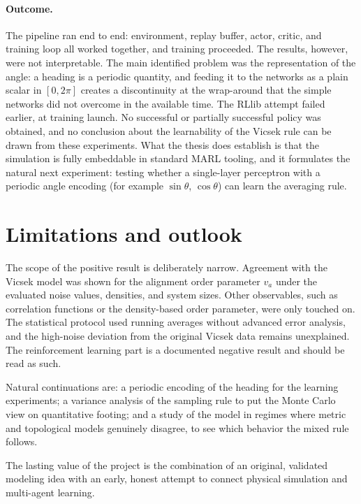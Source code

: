\documentclass[10pt,a4paper,twocolumn]{article}
\begin{document}
\paragraph{Outcome.}
The pipeline ran end to end: environment, replay buffer, actor,
critic, and training loop all worked together, and training
proceeded. The results, however, were not interpretable. The main
identified problem was the representation of the angle: a heading is
a periodic quantity, and feeding it to the networks as a plain scalar
in $[0, 2\pi]$ creates a discontinuity at the wrap-around that the
simple networks did not overcome in the available time. The RLlib
attempt failed earlier, at training launch. No successful or
partially successful policy was obtained, and no conclusion about the
learnability of the Vicsek rule can be drawn from these experiments.
What the thesis does establish is that the simulation is fully
embeddable in standard MARL tooling, and it formulates the natural
next experiment: testing whether a single-layer perceptron with a
periodic angle encoding (for example $\sin\theta$, $\cos\theta$) can
learn the averaging rule.

\section{Limitations and outlook}

The scope of the positive result is deliberately narrow. Agreement
with the Vicsek model was shown for the alignment order parameter
$v_a$ under the evaluated noise values, densities, and system sizes.
Other observables, such as correlation functions or the
density-based order parameter, were only touched on. The statistical
protocol used running averages without advanced error analysis, and
the high-noise deviation from the original Vicsek data remains
unexplained. The reinforcement learning part is a documented negative
result and should be read as such.

Natural continuations are: a periodic encoding of the heading for the
learning experiments; a variance analysis of the sampling rule to
put the Monte Carlo view on quantitative footing; and a study of the
model in regimes where metric and topological models genuinely
disagree, to see which behavior the mixed rule follows.

\medskip

The lasting value of the project is the combination of an original,
validated modeling idea with an early, honest attempt to connect
physical simulation and multi-agent learning.

\clearpage
\printbibliography
\end{document}
